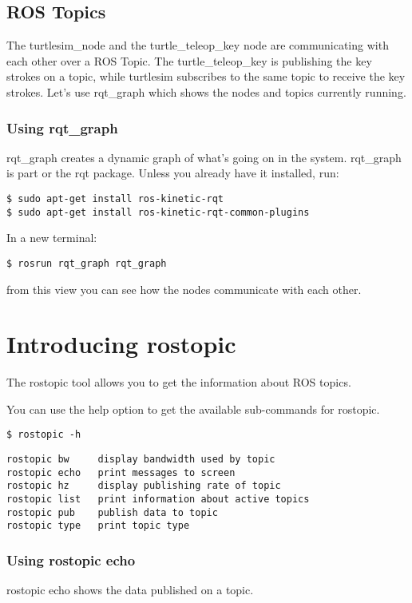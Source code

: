 \subsection{ROS Topics}
The turtlesim\_node and the turtle\_teleop\_key node are communicating with each other over a ROS Topic. The turtle\_teleop\_key is publishing the key strokes on a topic, while turtlesim subscribes to the same topic to receive the key strokes. Let's use rqt\_graph which shows the nodes and topics currently running.

\subsubsection{Using rqt\_graph}
rqt\_graph creates a dynamic graph of what's going on in the system. rqt\_graph is part or the rqt package. Unless you already have it installed, run:
\begin{lstlisting}[breaklines=true languages=bash]
$ sudo apt-get install ros-kinetic-rqt
$ sudo apt-get install ros-kinetic-rqt-common-plugins
\end{lstlisting}

In a new terminal:

\begin{lstlisting}[breaklines=true languages=bash]
$ rosrun rqt_graph rqt_graph
\end{lstlisting}

from this view you can see how the nodes communicate with each other.

\section{Introducing rostopic}
The rostopic tool allows you to get the information about ROS topics.

You can use the help option to get the available sub-commands for rostopic.
\begin{lstlisting}[breaklines=true languages=bash]
$ rostopic -h
\end{lstlisting}

\begin{lstlisting}[breaklines=true languages=bash]
rostopic bw     display bandwidth used by topic
rostopic echo   print messages to screen
rostopic hz     display publishing rate of topic    
rostopic list   print information about active topics
rostopic pub    publish data to topic
rostopic type   print topic type
\end{lstlisting}

\subsubsection{Using rostopic echo}
rostopic echo shows the data published on a topic.

